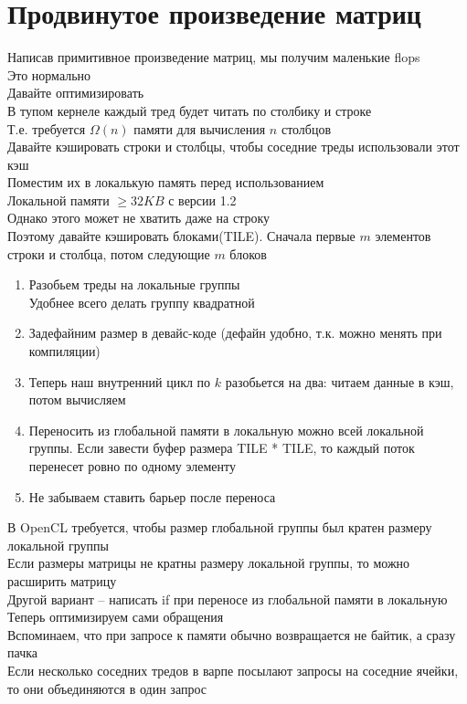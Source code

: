 \documentclass[12pt]{article}
\begin{document}
\section{Продвинутое произведение матриц}
Написав примитивное произведение матриц, мы получим маленькие flops\\
Это нормально\\
Давайте оптимизировать\\
В тупом кернеле каждый тред будет читать по столбику и строке\\
Т.е. требуется $\Omega(n)$ памяти для вычисления $n$ столбцов\\
Давайте кэшировать строки и столбцы, чтобы соседние треды использовали этот кэш\\
Поместим их в локалькую память перед использованием\\
Локальной памяти $\geq 32KB$ с версии 1.2\\
Однако этого может не хватить даже на строку\\
Поэтому давайте кэшировать блоками(TILE). Сначала первые $m$ элементов строки и столбца, потом следующие $m$ блоков
\begin{enumerate}
    \item Разобьем треды на локальные группы\\
    Удобнее всего делать группу квадратной
    \item Задефайним размер  в девайс-коде (дефайн удобно, т.к. можно менять при компиляции)
    \item Теперь наш внутренний цикл по $k$ разобьется на два: читаем данные в кэш, потом вычисляем
    \item Переносить из глобальной памяти в локальную можно всей локальной группы. Если завести буфер размера TILE * TILE, то каждый поток перенесет ровно по одному элементу
    \item Не забываем ставить барьер после переноса
\end{enumerate}
В OpenCL требуется, чтобы размер глобальной группы был кратен размеру локальной группы\\
Если размеры матрицы не кратны размеру локальной группы, то можно расширить матрицу\\
Другой вариант -- написать if при переносе из глобальной памяти в локальную\\
Теперь оптимизируем сами обращения\\
Вспоминаем, что при запросе к памяти обычно возвращается не байтик, а сразу пачка\\
Если несколько соседних тредов в варпе посылают запросы на соседние ячейки, то они объединяются в один запрос\\
\end{document}
